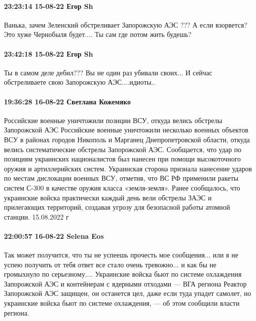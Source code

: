 \paragraph{23:23:14 15-08-22 Егор Sh}

Ванька, зачем Зеленский обстреливает Запорожскую АЭС ??? А если взорвется? Это
хуже Чернобыля будет.... Ты сам где потом жить будешь?

\paragraph{23:42:18 15-08-22 Егор Sh}

Ты в самом деле дебил??? Вы не один раз убивали своих... И сейчас обстреливаете
свою Запорожскую АЭС....идиоты..

\paragraph{19:36:28 16-08-22 Светлана Кожемяко}

\obeycr
Российские военные уничтожили позиции ВСУ, откуда велись обстрелы Запорожской АЭС
Российские военные уничтожили несколько военных объектов ВСУ в районах городов Никополь и Марганец Днепропетровской области, откуда велись систематические обстрелы Запорожской АЭС.
Сообщается, что удар по позициям украинских националистов был нанесен при помощи высокоточного оружия и артиллерийских систем.
Украинская сторона признала нанесение ударов по местам дислокации военных ВСУ, отметив, что ВС РФ применили ракеты систем С-300 в качестве оружия класса «земля-земля».
Ранее сообщалось, что украинские войска практически каждый день вели обстрелы ЗАЭС и прилегающих территорий, создавая угрозу для безопасной работы атомной станции. 15.08.2022 г
\restorecr

\paragraph{22:00:57 16-08-22 Selena Eos}

\obeycr
Так может получится, что ты не успеешь прочесть мое сообщения... или я не успею получить от тебя ответ
все стало очень тревожно... и как бы не громыхнуло по серьезному....
Украинские войска бьют по системе охлаждения Запорожской АЭС и контейнерам с ядерными отходами — ВГА региона
Реактор Запорожской АЭС защищен, он останется цел, даже если туда упадет самолет, но украинские войска бьют по системе охлаждения, — об этом сообщили власти региона.
\restorecr
